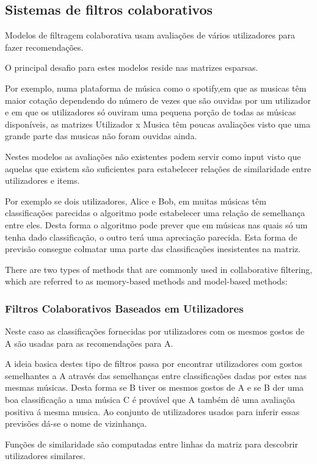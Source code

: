 \subsection{Sistemas de filtros colaborativos}
\hfill
\par Modelos de filtragem colaborativa usam avaliações de vários utilizadores para fazer recomendações.
\par O principal desafio para estes modelos reside nas matrizes esparsas.
\par Por exemplo, numa plataforma de música como o spotify,em que as musicas têm maior cotação dependendo do número de vezes que são ouvidas por um utilizador e em que os utilizadores só ouviram uma pequena porção de todas as músicas disponíveis, as matrizes Utilizador x Musica têm poucas avaliações visto que uma grande parte das musicas não foram ouvidas ainda.
\par Nestes modelos as avaliações não existentes podem servir como input visto que aquelas que existem são suficientes para estabelecer relações de similaridade entre utilizadores e items.
\par Por exemplo se dois utilizadores, Alice e Bob, em muitas músicas têm classificações parecidas o algoritmo pode estabelecer uma relação de semelhança entre eles. Desta forma o algoritmo pode prever que em músicas nas quais só um tenha dado classificação, o outro terá uma apreciação parecida. Esta forma de previsão consegue colmatar uma parte das classificações inesistentes na matriz.

There are two types of methods that are commonly used in collaborative filtering, which are referred to as memory-based methods and model-based methods:

\hfill
\subsubsection{ Filtros Colaborativos Baseados em Utilizadores}
\hfill
 \par Neste caso as classificações fornecidas por utilizadores com os mesmos gostos de A são usadas para as recomendações para A. 
 \par A ideia basica destes tipo de filtros passa por encontrar utilizadores com gostos semelhantes a A através das semelhanças entre classificações dadas por estes nas mesmas músicas. Desta forma se B tiver os mesmos gostos de A e se B der uma boa classificação a uma música C é provável que A também dê uma avaliaçõa positiva á mesma musica. Ao conjunto de utilizadores usados para inferir essas previsões dá-se o nome de vizinhança.
 \par Funções de similaridade são computadas entre linhas da matriz para descobrir utilizadores similares.


